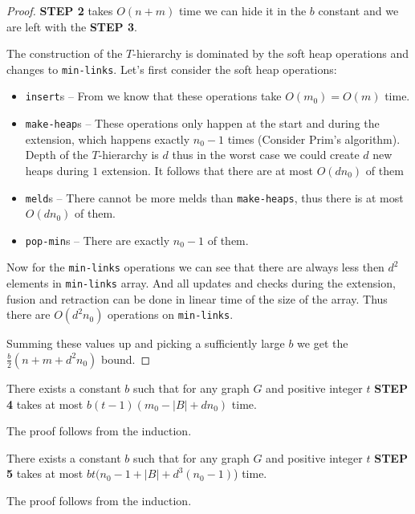 \begin{proof}
    \textbf{STEP 2} takes $O(n + m)$ time we can hide it in the $b$ constant and we are left with the \textbf{STEP 3}.

    The construction of the $T$-hierarchy is dominated by the soft heap operations and changes to \texttt{min-links}. Let's first consider the soft heap operations:
    \begin{itemize}
        \item \texttt{insert}s -- From  we know that these operations take $O(m_0) = O(m)$ time.
        \item \texttt{make-heap}s -- These operations only happen at the start and during the extension, which happens exactly $n_0 - 1$ times (Consider Prim's algorithm). Depth of the $T$-hierarchy is $d$ thus in the worst case we could create $d$ new heaps during $1$ extension. It follows that there are at most $O(dn_0)$ of them
        \item \texttt{meld}s -- There cannot be more melds than \texttt{make-heaps}, thus there is at most $O(dn_0)$ of them.
        \item \texttt{pop-min}s -- There are exactly $n_0 - 1$ of them.
    \end{itemize}

    Now for the \texttt{min-links} operations we can see that there are always less then $d^2$ elements in \texttt{min-links} array. And all updates and checks during the extension, fusion and retraction can be done in linear time of the size of the array. Thus there are $O(d^2n_0)$ operations on \texttt{min-links}.

    Summing these values up and picking a sufficiently large $b$ we get the $\frac{b}2(n+m+d^2n_0)$ bound.
\end{proof}

\begin{lemma}
    There exists a constant $b$ such that for any graph $G$ and positive integer $t$ \textbf{STEP 4} takes at most $b(t-1)(m_0 - |B| + dn_0)$ time.
    \label{s4}
\end{lemma}
The proof follows from the induction.

\begin{lemma}
    There exists a constant $b$ such that for any graph $G$ and positive integer $t$ \textbf{STEP 5} takes at most $bt(n_0 - 1 + |B| + d^3(n_0 - 1)$) time.
    \label{s5}
\end{lemma}
The proof follows from the induction.

